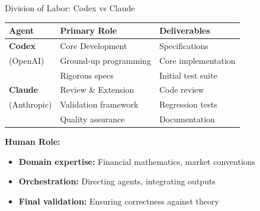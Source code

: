 \documentclass[aspectratio=169,11pt]{beamer}
\begin{document}
\begin{frame}{Division of Labor: Codex vs Claude}
\begin{table}
\centering
\begin{tabular}{lll}
\toprule
\textbf{Agent} & \textbf{Primary Role} & \textbf{Deliverables} \\
\midrule
\textbf{Codex} & Core Development & Specifications \\
(OpenAI) & Ground-up programming & Core implementation \\
 & Rigorous specs & Initial test suite \\
\midrule
\textbf{Claude} & Review \& Extension & Code review \\
(Anthropic) & Validation framework & Regression tests \\
 & Quality assurance & Documentation \\
\bottomrule
\end{tabular}
\end{table}

\textbf{Human Role:}
\begin{itemize}
    \item \textbf{Domain expertise:} Financial mathematics, market conventions
    \item \textbf{Orchestration:} Directing agents, integrating outputs
    \item \textbf{Final validation:} Ensuring correctness against theory
\end{itemize}
\end{frame}
\end{document}
